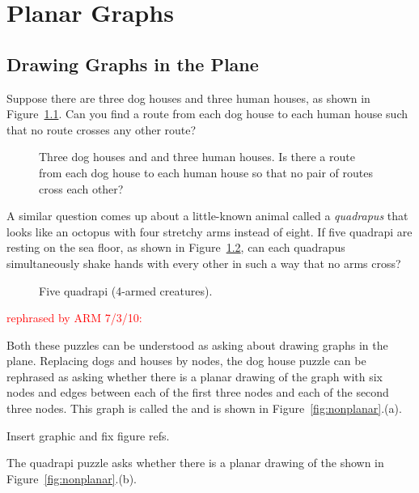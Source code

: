 \chapter{Planar Graphs}\label{planar_graphs_chap}

\section{Drawing Graphs in the Plane}

Suppose there are three dog houses and three human houses, as shown in
Figure~\ref{fig:5DP}.  Can you find a route from each dog house to
each human house such that no route crosses any other route?

\begin{figure}


\caption{Three dog houses and and three human houses.  Is there a
  route from each dog house to each human house so that no pair of
  routes cross each other?}
\label{fig:5DP}
\end{figure}

A similar question comes up about a little-known animal called a
\emph{quadrapus} that looks like an octopus with four stretchy arms
instead of eight.  If five quadrapi are resting on the sea floor, as shown
in Figure~\ref{fig:5DA}, can each quadrapus simultaneously shake hands
with every other in such a way that no arms cross?

\begin{figure}


\caption{Five quadrapi (4-armed creatures).}

\label{fig:5DA}

\end{figure}


\begin{editingnotes}
\textcolor{red}{rephrased by ARM 7/3/10:}
\end{editingnotes}

Both these puzzles can be understood as asking about drawing graphs in the
plane.  Replacing dogs and houses by nodes, the dog house puzzle can be
rephrased as asking whether there is a planar drawing of the graph with
six nodes and edges between each of the first three nodes and each of the
second three nodes.  This graph is called the   and is shown in Figure~\ref{fig:nonplanar}.(a).
\begin{editingnotes}
Insert graphic and fix figure refs.
\end{editingnotes}
The quadrapi puzzle asks whether there is a planar drawing of the
  shown in
Figure~\ref{fig:nonplanar}.(b).


